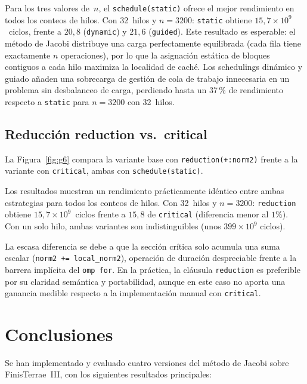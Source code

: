 \documentclass[a4paper,twocolumn]{article}
\begin{document}
Para los tres valores de~$n$, el \texttt{schedule(static)} ofrece el mejor
rendimiento en todos los conteos de hilos.  Con 32~hilos y $n{=}3200$:
\texttt{static} obtiene $15{,}7 \times 10^9$~ciclos, frente a $20{,}8$
(\texttt{dynamic}) y $21{,}6$ (\texttt{guided}).  Este resultado es
esperable: el método de Jacobi distribuye una carga perfectamente equilibrada
(cada fila tiene exactamente $n$ operaciones), por lo que la asignación
estática de bloques contiguos a cada hilo maximiza la localidad de caché.
Los schedulings dinámico y guiado añaden una sobrecarga de gestión de cola
de trabajo innecesaria en un problema sin desbalanceo de carga, perdiendo
hasta un 37\,\% de rendimiento respecto a \texttt{static} para $n{=}3200$
con 32~hilos.



\subsection{Reducción reduction vs.\ critical}

La Figura~\ref{fig:g6} compara la variante base con
\texttt{reduction(+:norm2)} frente a la variante con \texttt{critical},
ambas con \texttt{schedule(static)}.

Los resultados muestran un rendimiento prácticamente idéntico entre ambas
estrategias para todos los conteos de hilos.  Con 32~hilos y $n=3200$:
\texttt{reduction} obtiene $15{,}7 \times 10^9$~ciclos frente a $15{,}8$
de \texttt{critical} (diferencia menor al $1\%$). Con un solo hilo, ambas
variantes son indistinguibles (unos $399 \times 10^9$ ciclos).

La escasa diferencia se debe a que la sección crítica solo acumula una suma
escalar (\texttt{norm2~+=~local\_norm2}), operación de duración despreciable
frente a la barrera implícita del \texttt{omp for}.  En la práctica, la
cláusula \texttt{reduction} es preferible por su claridad semántica y
portabilidad, aunque en este caso no aporta una ganancia medible respecto a
la implementación manual con \texttt{critical}.



\section{Conclusiones}

Se han implementado y evaluado cuatro versiones del método de Jacobi sobre
FinisTerrae~III, con los siguientes resultados principales:
\end{document}
